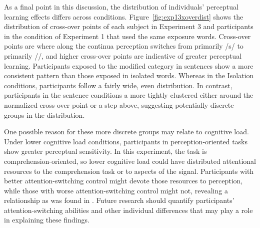 As a final point in this discussion, the distribution of individuals' perceptual learning effects differs across conditions. 
Figure~\ref{fig:exp13xoverdist} shows the distribution of cross-over points of each subject in Experiment 3 and participants in the condition of Experiment 1 that used the same exposure words.  
Cross-over points are where along the continua perception switches from primarily /s/ to primarily /\textesh/, and higher cross-over points are indicative of greater perceptual learning.
Participants exposed to the modified category in sentences show a more consistent pattern than those exposed in isolated words.
Whereas in the Isolation conditions, participants follow a fairly wide, even distribution.
In contrast, participants in the sentence conditions a more tightly clustered either around the normalized cross over point or a step above, suggesting potentially discrete groups in the distribution.

One possible reason for these more discrete groups may relate to cognitive load.
Under lower cognitive load conditions, participants in perception-oriented tasks show greater perceptual sensitivity.
In this experiment, the task is comprehension-oriented, so lower cognitive load could have distributed attentional resources to the comprehension task or to aspects of the signal.
Participants with better attention-switching control might devote those resources to perception, while those with worse attention-switching control might not, revealing a relationship as was found in \citet{Scharenborg2013}.
Future research should quantify participants' attention-switching abilities and other individual differences that may play a role in explaining these findings.



